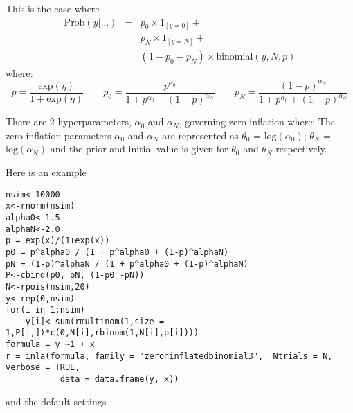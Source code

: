 \documentclass[a4paper,11pt]{article}
\begin{document}
This is the case where
\begin{eqnarray*}
  \mbox{Prob}(y|\ldots) &=& p_0 \times 1_{[y=0]}+\\
                        && p_N \times 1_{[y=N]}+\\
                        &&(1-p_0 - p_N) \times \mbox{binomial}(y,N,p)
\end{eqnarray*}
where:
\begin{displaymath}
    p = \frac{\mbox{exp}(\eta)}{1+\mbox{exp}(\eta)}\qquad
    p_0 = \frac{p^{\alpha_0}}{1+p^{\alpha_0}+(1-p)^{\alpha_N}}\qquad
    p_N = \frac{(1-p)^{\alpha_N}}{1+p^{\alpha_0}+(1-p)^{\alpha_N}}
\end{displaymath}

There are 2 hyperparameters, $\alpha_0$ and $\alpha_N$, governing
zero-inflation where: The zero-inflation parameters $\alpha_0$ and
$\alpha_N$ are represented as $\theta_0$ = $\mbox{log}(\alpha_0)$;
$\theta_N$ = $\mbox{log}(\alpha_N)$ and the prior and initial value is
given for $\theta_0$ and $\theta_N$ respectively.

Here is an example
\begin{verbatim}
nsim<-10000
x<-rnorm(nsim)
alpha0<-1.5
alphaN<-2.0
p = exp(x)/(1+exp(x))
p0 = p^alpha0 / (1 + p^alpha0 + (1-p)^alphaN)
pN = (1-p)^alphaN / (1 + p^alpha0 + (1-p)^alphaN)
P<-cbind(p0, pN, (1-p0 -pN))
N<-rpois(nsim,20)
y<-rep(0,nsim)
for(i in 1:nsim)
    y[i]<-sum(rmultinom(1,size = 1,P[i,])*c(0,N[i],rbinom(1,N[i],p[i])))
formula = y ~1 + x  
r = inla(formula, family = "zeroninflatedbinomial3",  Ntrials = N, verbose = TRUE,
           data = data.frame(y, x))
\end{verbatim}
and the default settings

\end{document}
